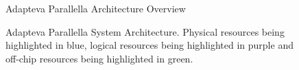     
    \begin{figure}[!ht]
        \centering
        \caption{Adapteva Parallella Architecture Overview}
        \label{FIGURE:REQUIRED_KNOWLEDGE_PARALLELA_ARCHITECTURE_OVERVIEW}
    \end{figure}

    \begin{figure}[!ht]
        \centering
        \caption{Adapteva Parallella System Architecture. Physical resources being highlighted in blue, logical resources
        being highlighted in purple and off-chip resources being highlighted in green.}
        \label{FIGURE:REQUIRED_KNOWLEDGE_PARALLELA_SYSTEM_ARCHITECTURE}
    \end{figure}

